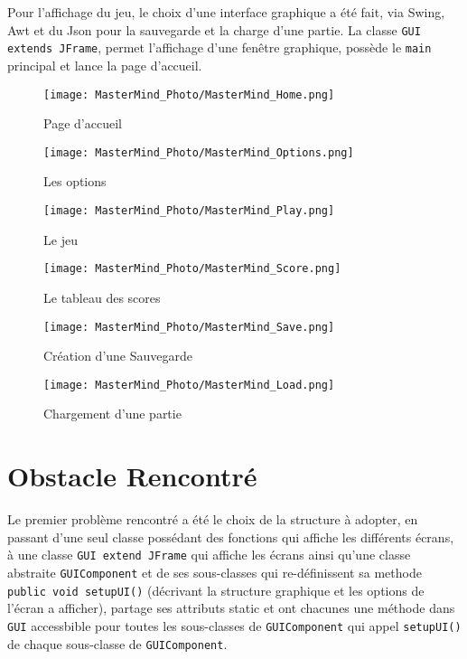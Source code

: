 \documentclass{article}
\begin{document}
Pour l'affichage du jeu, le choix d'une interface graphique a été fait, via Swing, Awt et du Json pour la sauvegarde et la charge d'une partie. La classe \texttt{GUI extends JFrame}, permet l'affichage d'une fenêtre graphique, possède le \texttt{main} principal et lance la page d'accueil.

\begin{figure}[h]
\begin{minipage}{0.3\textwidth}
\centering
\texttt{[image: MasterMind\_Photo/MasterMind\_Home.png]}
\caption{Page d'accueil}
\label{fig:Home}
\end{minipage}\hfill
\begin{minipage}{0.3\textwidth}
\centering
\texttt{[image: MasterMind\_Photo/MasterMind\_Options.png]}
\caption{Les options}
\label{fig:Options}
\end{minipage}\hfill
\begin{minipage}{0.3\textwidth}
\centering
\texttt{[image: MasterMind\_Photo/MasterMind\_Play.png]}
\caption{Le jeu}
\label{fig:Play}
\end{minipage}
\begin{minipage}{0.3\textwidth}
\centering
\texttt{[image: MasterMind\_Photo/MasterMind\_Score.png]}
\caption{Le tableau des scores}
\label{fig:Score}
\end{minipage}
\begin{minipage}{0.3\textwidth}
\centering
\texttt{[image: MasterMind\_Photo/MasterMind\_Save.png]}
\caption{Création d'une Sauvegarde}
\label{fig:Home}
\end{minipage}\hfill
\begin{minipage}{0.3\textwidth}
\centering
\texttt{[image: MasterMind\_Photo/MasterMind\_Load.png]}
\caption{Chargement d'une partie}
\label{fig:Home}
\end{minipage}\hfill
\end{figure}

\section{Obstacle Rencontré}
Le premier problème rencontré a été le choix de la structure à adopter, en passant d'une seul classe possédant des fonctions qui affiche les différents écrans, à une classe \texttt{GUI extend JFrame} qui affiche les écrans ainsi qu'une classe abstraite \texttt{GUIComponent} et de ses sous-classes qui re-définissent sa methode \texttt{public void setupUI()} (décrivant la structure graphique et les options de l'écran a afficher), partage ses attributs static et ont chacunes une méthode dans \texttt{GUI} accessbible pour toutes les sous-classes de \texttt{GUIComponent} qui appel \texttt{setupUI()} de chaque sous-classe de \texttt{GUIComponent}.
\end{document}
